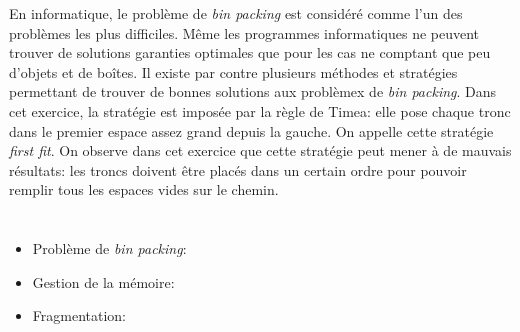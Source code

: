 {{En informatique, le problème de \emph{bin packing} est considéré comme l’un des problèmes les plus difficiles. Même les programmes informatiques ne peuvent trouver de solutions garanties optimales que pour les cas ne comptant que peu d’objets et de boîtes. Il existe par contre plusieurs méthodes et stratégies permettant de trouver de bonnes solutions aux problèmex de \emph{bin packing}. Dans cet exercice, la stratégie est imposée par la règle de Timea: elle pose chaque tronc dans le premier espace assez grand depuis la gauche. On appelle cette stratégie \emph{first fit}. On observe dans cet exercice que cette stratégie peut mener à de mauvais résultats: les troncs doivent être placés dans un certain ordre pour pouvoir remplir tous les espaces vides sur le chemin.



\section*{\BrochureWebsitesAndKeywords}
{\raggedright
\begin{itemize}
  \item Problème de \emph{bin packing}: \href{https://fr.wikipedia.org/wiki/Probl\%C3\%A8me_de_bin_packing}{}
  \item Gestion de la mémoire: \href{https://fr.wikipedia.org/wiki/Gestion_de_la_m\%C3\%A9moire}{}
  \item Fragmentation: \href{https://fr.wikipedia.org/wiki/Fragmentation_(informatique)}{}
\end{itemize}


}

}{}

\def\AuthorPelletJ{} %
\def\AuthorDatzkoThutS{} %
\def\AuthorDasovicD{} %
\def\AuthorBaumannL{} %
\def\AuthorPelletE{} %

\newpage}{}
